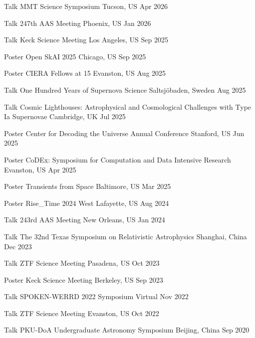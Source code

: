 \begin{cventries}
	

	\cvsimsimpentry
	{Talk}
	{MMT Science Symposium}
	{Tucson, US}
	{Apr 2026}

	\cvsimsimpentry
	{Talk}
	{247th AAS Meeting}
	{Phoenix, US}
	{Jan 2026}

	\cvsimsimpentry
	{Talk}
	{Keck Science Meeting}
	{Los Angeles, US}
	{Sep 2025}

	\cvsimsimpentry
	{Poster}
	{Open SkAI 2025}
	{Chicago, US}
	{Sep 2025}

	\cvsimsimpentry
	{Poster}
	{CIERA Fellows at 15}
	{Evanston, US}
	{Aug 2025}

	\cvsimsimpentry
	{Talk}
	{One Hundred Years of Supernova Science}
	{Saltsjöbaden, Sweden}
	{Aug 2025}

	\cvsimsimpentry
	{Talk}
	{Cosmic Lighthouses: Astrophysical and Cosmological Challenges with Type Ia Supernovae}
	{Cambridge, UK}
	{Jul 2025}

	\cvsimsimpentry
	{Poster}
	{Center for Decoding the Universe Annual Conference}
	{Stanford, US}
	{Jun 2025}

	\cvsimsimpentry
	{Poster}
	{CoDEx: Symposium for Computation and Data Intensive Research}
	{Evanston, US}
	{Apr 2025}

	\cvsimsimpentry
	{Poster}
	{Transients from Space}
	{Baltimore, US}
	{Mar 2025}

	\cvsimsimpentry
	{Poster}
	{Rise\_Time 2024}
	{West Lafayette, US}
	{Aug 2024}

	\cvsimsimpentry
	{Talk}
	{243rd AAS Meeting}
	{New Orleans, US}
	{Jan 2024}

	\cvsimsimpentry
	{Talk}
	{The 32nd Texas Symposium on Relativistic Astrophysics}
	{Shanghai, China}
	{Dec 2023}

	\cvsimsimpentry
	{Talk}
	{ZTF Science Meeting}
	{Pasadena, US}
	{Oct 2023}
	
	\cvsimsimpentry
	{Poster}
	{Keck Science Meeting}
	{Berkeley, US}
	{Sep 2023}

	\cvsimsimpentry
	{Talk}
	{SPOKEN-WERRD 2022 Symposium} %
	{Virtual} %
	{Nov 2022} %

	\cvsimsimpentry
	{Talk} %
	{ZTF Science Meeting} %
	{Evanston, US} %
	{Oct 2022} %
	
	\cvsimsimpentry
	{Talk} %
	{PKU-DoA Undergraduate Astronomy Symposium} %
	{Beijing, China} %
	{Sep 2020} %

\end{cventries}